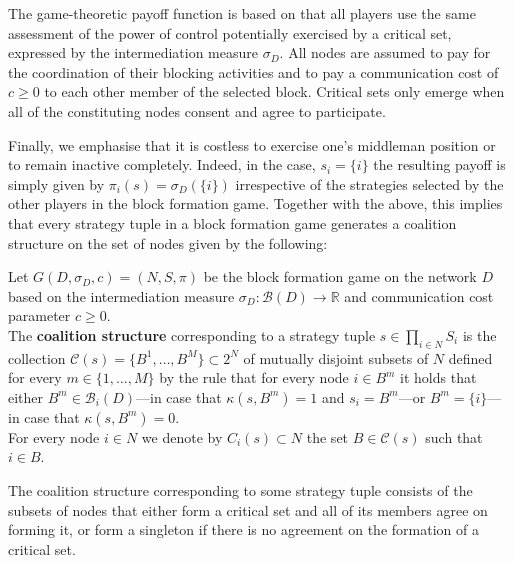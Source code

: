 The game-theoretic payoff function is based on that all players use the same assessment of the power of control potentially exercised by a critical set, expressed by the intermediation measure $\sigma_D$. All nodes are assumed to pay for the coordination of their blocking activities and to pay a communication cost of $c \geqslant 0$ to each other member of the selected block. Critical sets only emerge when all of the constituting nodes consent and agree to participate.

Finally, we emphasise that it is costless to exercise one's middleman position or to remain inactive completely. Indeed, in the case, $s_i = \{ i \}$ the resulting payoff is simply given by $\pi_i (s) =\sigma_D ( \{ i \} )$ irrespective of the strategies selected by the other players in the block formation game. Together with the above, this implies that every strategy tuple in a block formation game generates a coalition structure on the set of nodes given by the following:
\begin{definition}
Let $G (D, \sigma_D ,c ) = (N,S, \pi )$ be the block formation game on the network $D$ based on the intermediation measure $\sigma_D \colon \mathcal{B} (D) \to \mathbb{R}$ and communication cost parameter $c \geqslant 0$.
\\
The \textbf{coalition structure} corresponding to a strategy tuple $s \in \prod_{i \in N} S_i$ is the collection $\mathcal{C} (s) = \{ B^1, \ldots ,B^M \} \subset 2^N$ of mutually disjoint subsets of $N$ defined for every $m \in \{ 1, \ldots ,M \}$ by the rule that for every node $i \in B^m$ it holds that either $B^m \in \mathcal{B}_i (D)$---in case that $\kappa (s, B^m)=1$ and $s_i = B^m$---or $B^m = \{ i \}$---in case that $\kappa (s,B^m) =0$.
\\
For every node $i \in N$ we denote by $C_i (s) \subset N$ the set $B \in \mathcal{C} (s)$ such that $i \in B$.
\end{definition}
The coalition structure corresponding to some strategy tuple consists of the subsets of nodes that either form a critical set and all of its members agree on forming it, or form a singleton if there is no agreement on the formation of a critical set.

